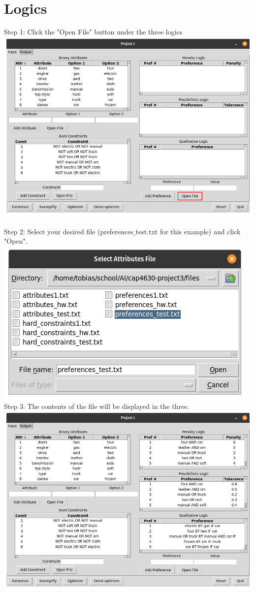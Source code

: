 \documentclass[12pt]{report}
\begin{document}
\section{Logics}
Step 1: Click the "Open File" button under the three logics\\
\includegraphics[scale=0.3]{input_preferences} \\\\
Step 2: Select your desired file (preferences$\_$test.txt for this example) and click "Open".\\
\includegraphics[scale=0.3]{select_preferences}\\
Step 3: The contents of the file will be displayed in the three.\\
\includegraphics[scale=0.3]{preferences_imported}
\end{document}
